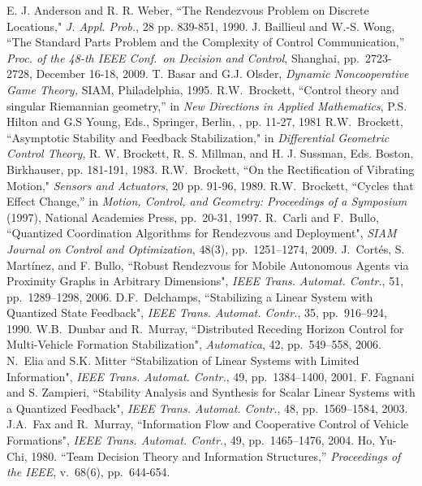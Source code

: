 \documentclass[12pt,onecolumn,draftcls]{IEEEtran}
\begin{document}
\begin{thebibliography}{99}
E. J. Anderson and R. R. Weber, ``The Rendezvous Problem on Discrete Locations,"
{\em J. Appl. Prob.}, 28 pp. 839-851, 1990.
J. Baillieul and W.-S. Wong, ``The Standard Parts Problem and the Complexity of Control Communication,''
{\em Proc. of the 48-th IEEE Conf.\ on Decision and Control}, Shanghai,  pp.~2723-2728, December 16-18, 2009.  
T. Basar and G.J. Olsder, {\em  Dynamic Noncooperative Game Theory,} SIAM, Philadelphia, 1995.
R.W.\ Brockett, ``Control theory and singular Riemannian geometry,'' in {\em New Directions in Applied Mathematics}, P.S. Hilton and G.S Young, Eds., Springer, Berlin, , pp. 11-27, 1981
R.W.\ Brockett, ``Asymptotic Stability and Feedback Stabilization," in {\em Differential Geometric Control Theory}, R. W. Brockett, R. S. Millman,
and H. J. Sussman, Eds. Boston, Birkhauser, pp. 181-191, 1983.
R.W.\ Brockett, ``On the Rectification of Vibrating Motion," {\em Sensors and Actuators}, 20 pp. 91-96, 1989.
R.W.\ Brockett, ``Cycles that Effect Change,'' in {\em Motion, Control, and Geometry: Proceedings of a Symposium} (1997), National Academies Press, pp.\ 20-31, 1997. 
R.\ Carli and F.\ Bullo, ``Quantized Coordination Algorithms for Rendezvous and Deployment", {\em SIAM Journal
on Control and Optimization}, 48(3), pp.~1251--1274, 2009.
J.\ Cort\'{e}s, S. Mart\'{i}nez, and F. Bullo, ``Robust Rendezvous for Mobile Autonomous Agents
via Proximity Graphs in Arbitrary Dimensions", {\em IEEE Trans. Automat. Contr.}, 51, pp.~1289--1298, 2006.
D.F.\ Delchamps, ``Stabilizing a Linear System with Quantized State Feedback", {\em IEEE Trans. Automat. Contr.},
35, pp.~916--924, 1990.
W.B.\ Dunbar and R.\ Murray, ``Distributed Receding Horizon Control for Multi-Vehicle Formation
Stabilization", {\em Automatica}, 42, pp.~549--558, 2006.
N.\ Elia and S.K. Mitter ``Stabilization of Linear Systems with Limited Information", 
{\em IEEE Trans. Automat. Contr.}, 49, pp.~1384--1400, 2001.
F. Fagnani and S. Zampieri, ``Stability Analysis and Synthesis for Scalar Linear Systems with a Quantized Feedback", 
{\em IEEE Trans. Automat. Contr.}, 48, pp.~1569--1584, 2003.
J.A.\ Fax and R.\ Murray, ``Information Flow and Cooperative Control
of Vehicle Formations", {\em IEEE Trans. Automat. Contr.}, 49, pp.~1465--1476, 2004.
Ho, Yu-Chi, 1980.  ``Team Decision Theory and Information Structures,'' {\em Proceedings of the IEEE}, v.\ 68(6), pp.\ 644-654.

\end{thebibliography}
\end{document}
